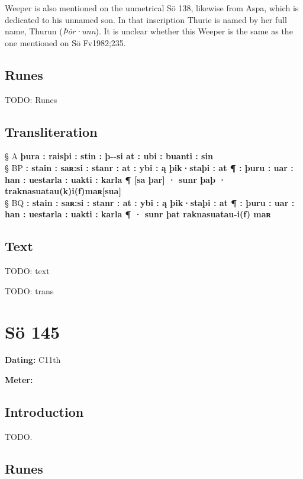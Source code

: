 Weeper is also mentioned on the unmetrical Sö 138, likewise from Aspa, which is dedicated to his unnamed son.  In that inscription Thurie is named by her full name, Thurun (\emph{Þȯr·unn}).  It is unclear whether this Weeper is the same as the one mentioned on Sö Fv1982;235.

\subsection{Runes}

TODO: Runes%

\subsection{Transliteration}

§ A \textbf{þura : raisþi : stin : þ-{}-si at : ubi : buanti : sin} \\
§ BP \textbf{: stain : saʀ:si : stanr : at : ybi : ą þik·staþi : at ¶ : þuru : uar : han : uestarla : uakti : karla ¶ [sa þar] · sunr þaþ · traknasuatau(k)i(f)maʀ[sua]} \\
§ BQ \textbf{: stain : saʀ:si : stanr : at : ybi : ą þik·staþi : at ¶ : þuru : uar : han : uestarla : uakti : karla ¶ · sunr þat raknasuatau-i(f) maʀ}

\subsection{Text}

\bpg\bpa[0]%
TODO: text\epa

\bpb TODO: trans\epb\epg

\sectionline\clearpage


\section{Sö 145}

\begin{flushright}%
\textbf{Dating:} C11th

\textbf{Meter:} \Fornyrdislag
\end{flushright}%

\subsection{Introduction}

TODO.

\subsection{Runes}

